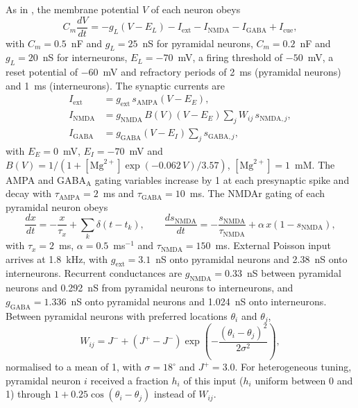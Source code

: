 \documentclass[11pt]{article}
\begin{document}
As in \citet{compte2000}, the membrane potential $V$ of each neuron obeys
\begin{equation*}
C_m \frac{dV}{dt} = -g_L (V - E_L) - I_\mathrm{ext} - I_\mathrm{NMDA} - I_\mathrm{GABA} + I_\mathrm{cue},
\end{equation*}
with $C_m = 0.5$~nF and $g_L = 25$~nS for pyramidal neurons, $C_m = 0.2$~nF and $g_L = 20$~nS for interneurons, $E_L = -70$~mV, a firing threshold of $-50$~mV, a reset potential of $-60$~mV and refractory periods of 2~ms (pyramidal neurons) and 1~ms (interneurons). The synaptic currents are
\begin{align*}
I_\mathrm{ext} &= g_\mathrm{ext}\, s_\mathrm{AMPA} (V - E_E), \\
I_\mathrm{NMDA} &= g_\mathrm{NMDA}\, B(V) (V - E_E) \textstyle\sum_j W_{ij}\, s_{\mathrm{NMDA},j}, \\
I_\mathrm{GABA} &= g_\mathrm{GABA} (V - E_I) \textstyle\sum_j s_{\mathrm{GABA},j},
\end{align*}
with $E_E = 0$~mV, $E_I = -70$~mV and $B(V) = 1/(1 + [\mathrm{Mg}^{2+}] \exp(-0.062\,V)/3.57)$, $[\mathrm{Mg}^{2+}] = 1$~mM. The AMPA and GABA$_\mathrm{A}$ gating variables increase by 1 at each presynaptic spike and decay with $\tau_\mathrm{AMPA} = 2$~ms and $\tau_\mathrm{GABA} = 10$~ms. The NMDAr gating of each pyramidal neuron obeys
\begin{equation*}
\frac{dx}{dt} = -\frac{x}{\tau_x} + \sum_k \delta(t - t_k), \qquad \frac{ds_\mathrm{NMDA}}{dt} = -\frac{s_\mathrm{NMDA}}{\tau_\mathrm{NMDA}} + \alpha\, x (1 - s_\mathrm{NMDA}),
\end{equation*}
with $\tau_x = 2$~ms, $\alpha = 0.5$~ms$^{-1}$ and $\tau_\mathrm{NMDA} = 150$~ms. External Poisson input arrives at 1.8~kHz, with $g_\mathrm{ext} = 3.1$~nS onto pyramidal neurons and 2.38~nS onto interneurons. Recurrent conductances are $g_\mathrm{NMDA} = 0.33$~nS between pyramidal neurons and 0.292~nS from pyramidal neurons to interneurons, and $g_\mathrm{GABA} = 1.336$~nS onto pyramidal neurons and 1.024~nS onto interneurons. Between pyramidal neurons with preferred locations $\theta_i$ and $\theta_j$,
\begin{equation*}
W_{ij} = J^- + (J^+ - J^-) \exp\!\left(-\frac{(\theta_i - \theta_j)^2}{2\sigma^2}\right),
\end{equation*}
normalised to a mean of 1, with $\sigma = 18^\circ$ and $J^+ = 3.0$. For heterogeneous tuning, pyramidal neuron $i$ received a fraction $h_i$ of this input ($h_i$ uniform between 0 and 1) through $1 + 0.25 \cos(\theta_i - \theta_j)$ instead of $W_{ij}$.
\end{document}
